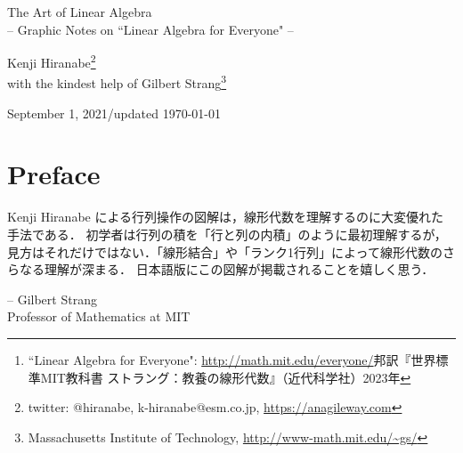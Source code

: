 \documentclass[letterpaper]{article}
\DeclareRobustCommand\transp{^{\mathrm{T}}}
\begin{document}
\begin{center}
{\LARGE The Art of Linear Algebra\\
\vspace{5pt}
\large{
-- Graphic Notes on ``Linear Algebra for Everyone" --
}
}

\vspace{1.5em}

Kenji Hiranabe\footnote{twitter: @hiranabe, k-hiranabe@esm.co.jp, \url{https://anagileway.com}} \\
with the kindest help of Gilbert Strang\footnote{Massachusetts Institute of Technology, \url{http://www-math.mit.edu/\~gs/}}

\vspace{1em}
September 1, 2021/updated \today
\end{center}

\vspace{1.5em}

\vspace{-5pt}
 
\begin{abstract}
Gilbert Strang 教授の書籍『Linear Algebra for Everyone』（邦訳『世界標準MIT教科書 ストラング：教養の線形代数』）
\footnote{``Linear Algebra for Everyone":
\url{http://math.mit.edu/everyone/}邦訳『世界標準MIT教科書 ストラング：教養の線形代数』（近代科学社）2023年}
の中で紹介されている重要なコンセプトについて，直感的で視覚的な表現を試みた．
ベクトルと行列の計算とアルゴリズムを，行列の積分解の視点から理解する新しい教育教材となることを目的としている．
ここで紹介する列・行分解には，（$\bm{CR}$）ガウスの消去法（$\bm{LU}$），
グラム・シュミットの直交化（$\bm{QR}$），対称行列の固有値と対角化（$\bm{Q \Lambda Q\transp}$），
特異値分解（$\bm{U \Sigma V\transp}$）の5分解が含まれる．
なお，本記事を含む図版は以下の GitHub レポジトリから取得できる．\url{https://github.com/kenjihiranabe/The-Art-of-Linear-Algebra/}．また，この記事の内容は2026年に以下のように書籍化された．\url{https://anagileway.com/visual-linear-algebra/}
\end{abstract}

\section*{Preface}
Kenji Hiranabe による行列操作の図解は，線形代数を理解するのに大変優れた手法である．
初学者は行列の積を「行と列の内積」のように最初理解するが，
見方はそれだけではない．「線形結合」や「ランク1行列」によって線形代数のさらなる理解が深まる．
日本語版にこの図解が掲載されることを嬉しく思う．
\begin{flushright}
-- Gilbert Strang \\ Professor of Mathematics at MIT
\end{flushright}
\end{document}
